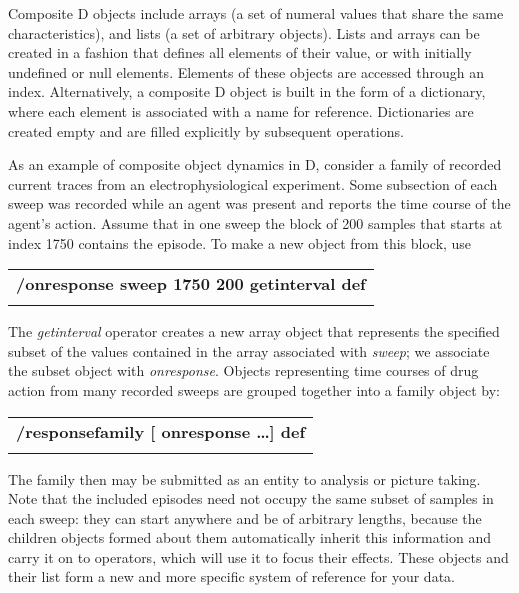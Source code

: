 Composite  D objects include arrays (a set of numeral values that  share the  same  characteristics),  and  lists (a set  of  arbitrary  objects). Lists and arrays can be created in a fashion that defines all elements of their value,  or with initially undefined or null elements.  Elements  of these objects are accessed through an index. Alternatively, a composite D object  is  built  in the form of a dictionary,  where  each  element  is associated with a name for reference.  Dictionaries are created empty and are filled explicitly by subsequent operations.

As  an example of composite object dynamics in D,  consider a family  of recorded current traces from an electrophysiological experiment.  Some subsection of each  sweep  was recorded while an agent was present and reports the time course of the agent's action.  Assume that in one  sweep  the block of 200 samples that starts at index 1750 contains the episode. To make a new object from this block, use\\

\begin{tabular}{>{\sffamily\bfseries}l}
   /onresponse sweep 1750 200 getinterval def\\\\
\end{tabular}

\noindent The  \emph{getinterval} operator creates a new array object  that  represents the specified subset of the values contained in the array associated with \emph{sweep}; we associate the subset object with \emph{onresponse}. Objects representing time courses of drug action from many recorded sweeps are grouped together into  a  family object by:\\

\begin{tabular}{>{\sffamily\bfseries}l}
  /responsefamily [ onresponse \ldots ] def\\\\
\end{tabular}

\noindent The  family  then may be submitted as an entity to analysis  or  picture taking.  Note  that  the included episodes need not occupy the  same  subset  of samples  in  each  sweep:  they can start anywhere and  be  of  arbitrary lengths, because the children objects formed about them automatically inherit this information  and  carry it on to operators,  which will use it  to  focus their effects. These objects and their list form a new and more specific system of reference for your data.

